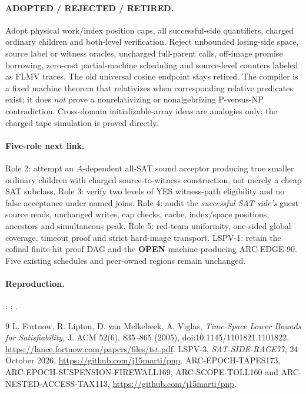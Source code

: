 \documentclass[11pt]{article}
\newcommand{\OPEN}{\textbf{OPEN}}
\begin{document}
\paragraph{ADOPTED / REJECTED / RETIRED.}
Adopt physical work/index position caps, all successful-side
quantifiers, charged ordinary children and both-level
verification. Reject unbounded losing-side space, source
label or witness oracles, uncharged full-parent calls,
off-image promise borrowing, zero-cost partial-machine
scheduling and source-level counters labeled as FLMV
traces. The old universal cosine endpoint stays retired.
The compiler is a fixed machine theorem that relativizes
when corresponding relative predicates exist; it does
\emph{not} prove a nonrelativizing or nonalgebrizing
P-versus-NP contradiction. Cross-domain initializable-array
ideas are analogies only; the charged tape simulation is
proved directly.

\paragraph{Five-role next link.}
Role 2: attempt an $A$-dependent all-SAT sound
acceptor producing true smaller ordinary children with
charged source-to-witness construction, not merely a
cheap SAT subclass. Role 3: verify two levels of YES
witness-path eligibility and no false acceptance under
named joins. Role 4: audit the \emph{successful SAT side's}
guest source reads, unchanged writes, cap checks, cache,
index/space positions, ancestors and simultaneous peak.
Role 5: red-team uniformity, one-sided global coverage,
timeout proof and strict hard-image transport. LSPV-1:
retain the cofinal finite-hit proof DAG and the \OPEN{}
machine-producing ARC-EDGE-90. Five existing schedules
and peer-owned regions remain unchanged.

\paragraph{Reproduction.}
;
;
.
\begin{thebibliography}{9}
L. Fortnow, R. Lipton, D. van Melkebeek, A. Viglas,
\emph{Time-Space Lower Bounds for Satisfiability},
J. ACM 52(6), 835--865 (2005),
doi:10.1145/1101821.1101822.
\url{https://lance.fortnow.com/papers/files/tst.pdf}.
LSPV-3, \emph{SAT-SIDE-RACE77}, 24 October 2026,
\url{https://github.com/j15marti/pnp}.
ARC-EPOCH-TAPES173, ARC-EPOCH-SUSPENSION-FIREWALL169,
ARC-SCOPE-TOLL160 and ARC-NESTED-ACCESS-TAX113,
\url{https://github.com/j15marti/pnp}.
\end{thebibliography}
\end{document}
